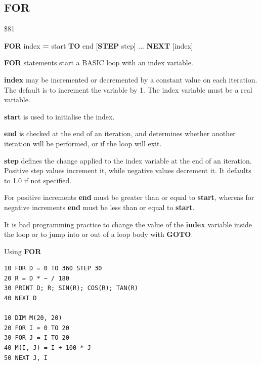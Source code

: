 \subsection{FOR}
\begin{description}[leftmargin=2cm,style=nextline]
\item [Token:]    \$81

\item [Format:]   {\bf FOR} index {\bf=} start {\bf TO} end	[{\bf STEP} step] ... {\bf NEXT} [index]

\item [Usage:]    {\bf FOR} statements start a BASIC loop with an index variable.

                  {\bf index} may be incremented or decremented by a constant value on each iteration. The default is to increment the variable by 1. The index variable must be a real variable.

                  {\bf start} is used to initialise the index.

                  {\bf end} is checked at the end of an iteration, and determines whether another iteration will be performed, or if the loop will exit.

                  {\bf step} defines the change applied to the index variable at the end of an iteration. Positive step values increment it, while negative values decrement it. It defaults to 1.0 if not specified.

\item [Remarks:]  For positive increments {\bf end} must be greater than or equal to {\bf start}, whereas for negative increments {\bf end} must be less than or equal to {\bf start}.

                  It is bad programming practice to change the value of the {\bf index} variable inside the loop or to jump into or out of a loop body with {\bf GOTO}.

\item [Examples:] Using {\bf FOR}

\begin{tcolorbox}[colback=black,coltext=white]
\verbatimfont{\codefont}
\begin{verbatim}
10 FOR D = 0 TO 360 STEP 30
20 R = D * ~ / 180
30 PRINT D; R; SIN(R); COS(R); TAN(R)
40 NEXT D

10 DIM M(20, 20)
20 FOR I = 0 TO 20
30 FOR J = I TO 20
40 M(I, J) = I + 100 * J
50 NEXT J, I
\end{verbatim}
\end{tcolorbox}
\end{description}

